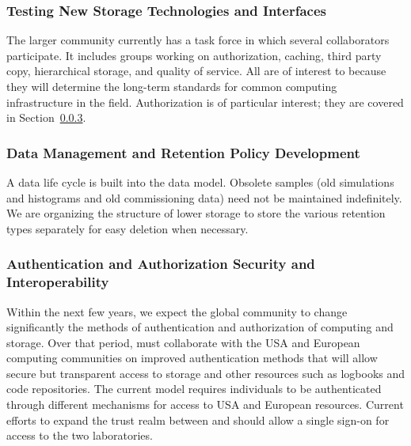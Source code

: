 
\subsubsection{Testing New Storage Technologies and Interfaces}

The larger  community\cite{Berzano:2018xaa} currently has a  task force
 in which several  collaborators participate. %
 It includes groups working on authorization, caching, third party copy, hierarchical storage, and quality of service. All are of interest to  because they will determine the long-term standards for common computing infrastructure in the field. 
Authorization is of particular interest; they are covered in Section~\ref{ch-comp-auth}.


\subsubsection{Data Management and Retention Policy Development}

A data life cycle is built into the  data model.  Obsolete samples (old simulations and histograms and old commissioning data) need not be maintained indefinitely.  
We are organizing the structure of lower storage to store the various retention types separately for easy deletion when necessary.  

\subsubsection{Authentication and Authorization Security and Interoperability}\label{ch-comp-auth}

Within the next few years, we expect the global  community to change significantly the methods of authentication and authorization of computing and storage. 
Over that period,  must collaborate with the USA and European  computing communities on improved authentication methods  that will allow secure but transparent access to storage and other resources such as logbooks and code repositories.  The current model requires individuals to %
be authenticated through different mechanisms for access to USA and European resources. %
Current efforts to expand the trust realm between  and  should allow a single sign-on for access to the two laboratories. %


